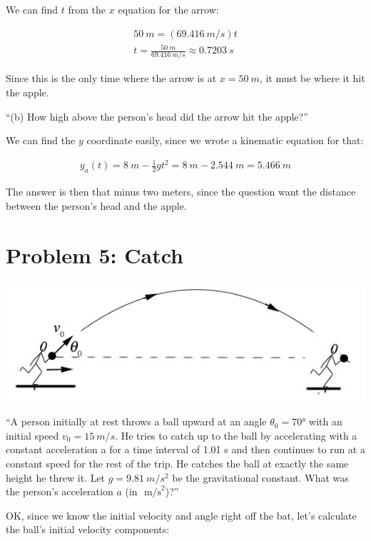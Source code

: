 \documentclass[12pt,a4paper]{report}
\begin{document}
We can find $t$ from the $x$ equation for the arrow:

\begin{align}
\SI{50}{m} = (\SI{69.416}{m/s}) t\\
t = \frac{\SI{50}{m}}{\SI{69.416}{m/s}} \approx \SI{0.7203}{s}
\end{align}

Since this is the only time where the arrow is at $x = \SI{50}{m}$, it must be where it hit the apple.

``(b) How high above the person's head did the arrow hit the apple?''

We can find the $y$ coordinate easily, since we wrote a kinematic equation for that:

\begin{align}
y_a(t) = \SI{8}{m} - \frac{1}{2} g t^2 = \SI{8}{m} - \SI{2.544}{m} = \SI{5.466}{m}
\end{align}

The answer is then that minus two meters, since the question want the distance between the person's head and the apple.

\section{Problem 5: Catch}

\begin{center}
\includegraphics[scale=0.6]{Graphics/h2p5}
\end{center}

``A person initially at rest throws a ball upward at an angle $\theta_0 = \ang{70}$ with an initial speed $v_0 = \SI{15}{m/s}$. He tries to catch up to the ball by accelerating with a constant acceleration a for a time interval of 1.01 s and then continues to run at a constant speed for the rest of the trip. He catches the ball at exactly the same height he threw it. Let $g = \SI{9.81}{m/s^2}$ be the gravitational constant. What was the person's acceleration $a$ (in $\text{ m/s}^2$)?''

OK, since we know the initial velocity and angle right off the bat, let's calculate the ball's initial velocity components:
\end{document}
